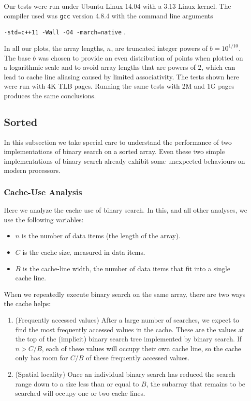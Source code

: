 \documentclass{patmorin}
\begin{document}
Our tests were run under Ubuntu Linux 14.04 with a 3.13 Linux kernel.
The compiler used was \texttt{gcc} version 4.8.4 with the command
line arguments \\
\centerline{  \texttt{-std=c++11 -Wall -O4 -march=native} \enspace . }
In all our plots, the array lengths, $n$, are truncated integer powers
of $b=10^{1/10}$.  The base $b$ was chosen to provide an even distribution
of points when plotted on a logarithmic scale and to avoid array lengths
that are powers of 2, which can lead to cache line aliasing caused by
limited associativity.  The tests shown here were run with 4K TLB pages.
Running the same tests with 2M and 1G pages produces the same conclusions.
 
\subsection{Sorted}

In this subsection we take special care to understand the performance of
two implementations of binary search on a sorted array.  Even these two
simple implementations of binary search already exhibit some unexpected
behaviours on modern processors.

\subsubsection{Cache-Use Analysis}

Here we analyze the cache use of binary search. In this, and all other
analyses, we use the following variables:

\begin{itemize}
  \item $n$ is the number of data items (the length of the array).
  \item $C$ is the cache size, measured in data items.
  \item $B$ is the cache-line width, the number of data items that fit
        into a single cache line.
\end{itemize}

When we repeatedly execute binary search on the same array, there are
two ways the cache helps:
\begin{enumerate}
  \item (Frequently accessed values) After a large number of searches,
    we expect to find the most frequently accessed values in the cache.
    These are the values at the top of the (implicit) binary search tree
    implemented by binary search.  If $n>C/B$, each of these values will
    occupy their own cache line, so the cache only has room for $C/B$
    of these frequently accessed values.
  \item (Spatial locality) Once an individual binary search has reduced
    the search range down to a size less than or equal to $B$, the
    subarray that remains to be searched will occupy one or two
    cache lines. 
\end{enumerate}
\end{document}
